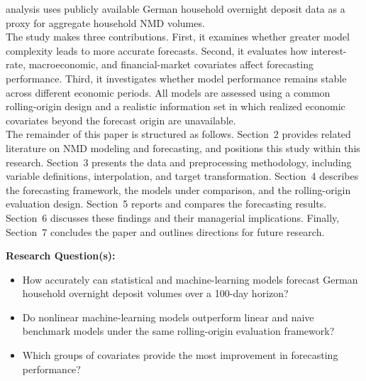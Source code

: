 \documentclass[11pt,a4paper]{article}
\begin{document}
analysis uses publicly available German household overnight deposit data as a
proxy for aggregate household NMD volumes.\\
The study makes three contributions. First, it examines whether greater model
complexity leads to more accurate forecasts. Second, it evaluates how
interest-rate, macroeconomic, and financial-market covariates affect forecasting
performance. Third, it investigates whether model performance remains stable
across different economic periods. All models are assessed using a common
rolling-origin design and a realistic information set in which realized economic
covariates beyond the forecast origin are unavailable.
\\
\indent The remainder of this paper is structured as follows. Section~2
provides related literature on NMD modeling and forecasting, and
positions this study within this research. Section~3 presents the
data and preprocessing methodology, including variable definitions,
interpolation, and target transformation. Section~4 describes the
forecasting framework, the models under comparison, and the
rolling-origin evaluation design. Section~5 reports and compares
the forecasting results. Section~6 discusses these findings and
their managerial implications. Finally, Section~7 concludes the
paper and outlines directions for future research.

\begin{researchquestion}
\textbf{Research Question(s):}
\begin{itemize}
    \item[\textbf{RQ1}] How accurately can statistical and machine-learning models
    forecast German household overnight deposit volumes over a 100-day horizon?
    \item[\textbf{RQ2}] Do nonlinear machine-learning models outperform linear and
    naive benchmark models under the same rolling-origin evaluation framework?
    \item[\textbf{RQ3}] Which groups of 
    covariates provide the most improvement in forecasting performance?
\end{itemize}
\end{researchquestion}

\end{document}
